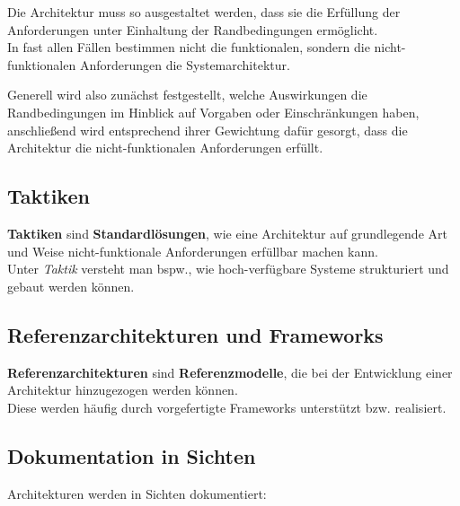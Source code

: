 \vspace{2mm}
\begin{tcolorbox}
    Die Architektur muss so ausgestaltet werden, dass sie die Erfüllung der Anforderungen unter Einhaltung der Randbedingungen ermöglicht.\\
    In fast allen Fällen bestimmen nicht die funktionalen, sondern die nicht-funktionalen Anforderungen die Systemarchitektur.
\end{tcolorbox}
\vspace{2mm}

\noindent
Generell wird also zunächst festgestellt, welche Auswirkungen die Randbedingungen im Hinblick auf Vorgaben oder Einschränkungen haben, anschließend wird entsprechend ihrer Gewichtung dafür gesorgt, dass die Architektur die nicht-funktionalen Anforderungen erfüllt.

\subsection*{Taktiken}
\textbf{Taktiken} sind \textbf{Standardlösungen}, wie eine Architektur auf grundlegende Art und Weise nicht-funktionale Anforderungen erfüllbar machen kann.\\
Unter \textit{Taktik} versteht man bspw., wie hoch-verfügbare Systeme strukturiert und gebaut werden können.

\subsection*{Referenzarchitekturen und Frameworks}
\textbf{Referenzarchitekturen} sind \textbf{Referenzmodelle}, die bei der Entwicklung einer Architektur hinzugezogen werden können.\\

\noindent
Diese werden häufig durch vorgefertigte Frameworks unterstützt bzw. realisiert.

\subsection*{Dokumentation in Sichten}
Architekturen werden in Sichten dokumentiert:

